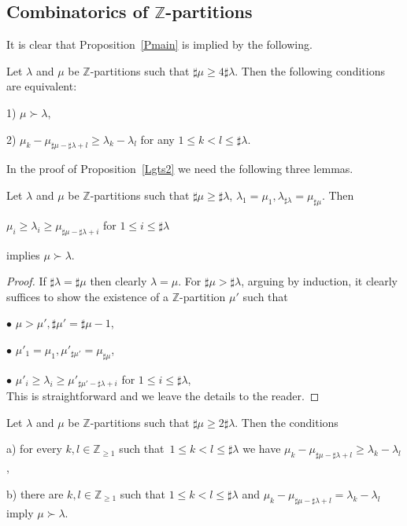 \documentclass[10pt]{amsart}\oddsidemargin -1mm \evensidemargin -1mm \topmargin -15mm\headheight5mm \headsep 3.5mm \textheight 245mm\textwidth 170mm %
\begin{document}
\subsection{Combinatorics of $\mathbb Z$-partitions}\label{SScomb}
It is clear that Proposition~\ref{Pmain} is implied by the following.
\begin{proposition}\label{Lgts2}Let $\lambda$ and $\mu$ be $\mathbb Z$-partitions such that $\sharp\mu\ge 4\sharp\lambda$. Then  the following conditions are equivalent:

1) $\mu\succ\lambda$,

2) $\mu_k-\mu_{\sharp\mu-\sharp\lambda+l}\ge\lambda_k-\lambda_l$ for any $1\le k<l\le\sharp\lambda$.
\end{proposition}
In the proof of Proposition~\ref{Lgts2} we need the following three lemmas.
\begin{lemma}\label{Lgts}Let $\lambda$ and $\mu$ be $\mathbb Z$-partitions such that $\sharp\mu\ge\sharp\lambda$, $\lambda_1=\mu_1, \lambda_{\sharp\lambda}=\mu_{\sharp\mu}$. Then \begin{center} $\mu_i\ge \lambda_i\ge \mu_{\sharp\mu-\sharp\lambda+i}$ for $1\le i\le \sharp\lambda$\end{center}
implies $\mu\succ\lambda$.\end{lemma}
\begin{proof}If $\sharp\lambda=\sharp\mu$ then clearly $\lambda=\mu$. For $\sharp\mu>\sharp\lambda$, arguing by induction, it clearly suffices to show the existence of a $\mathbb Z$-partition $\mu'$ such that

$\bullet$ $\mu>\mu', \sharp\mu'=\sharp\mu-1$,

$\bullet$ $\mu'_1=\mu_1, \mu'_{\sharp\mu'}=\mu_{\sharp\mu}$,

$\bullet$ $\mu'_i\ge\lambda_i\ge\mu'_{\sharp\mu'-\sharp\lambda+i}$ for $1\le i\le \sharp\lambda$,\\
This is straightforward and we leave the details to the reader.\end{proof}
\begin{lemma}\label{Lgts25}Let $\lambda$ and $\mu$ be $\mathbb Z$-partitions such that $\sharp\mu\ge 2\sharp\lambda$. Then the conditions

a) for every $k, l\in\mathbb Z_{\ge1}$ such that~$1\le k<l\le\sharp\lambda$ we have $\mu_k-\mu_{\sharp\mu-\sharp\lambda+l}\ge\lambda_k-\lambda_l$,

b) there are $k, l\in\mathbb Z_{\ge1}$ such that $1\le k<l\le\sharp\lambda$ and $\mu_k-\mu_{\sharp\mu-\sharp\lambda+l}=\lambda_k-\lambda_l$\\
imply $\mu\succ\lambda$.
\end{lemma}
\end{document}
